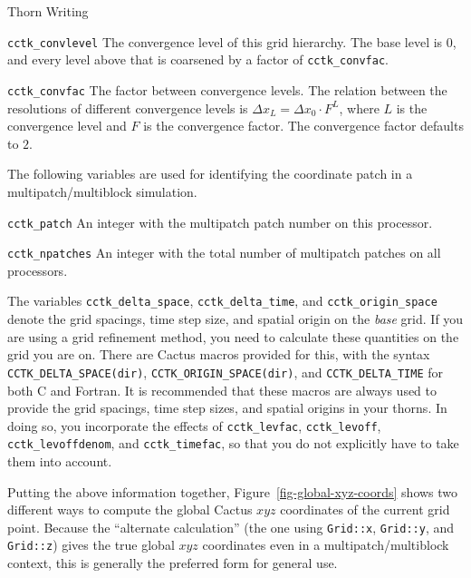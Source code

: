 \begin{cactuspart}{Thorn Writing}
\begin{Lentry}
\item [\texttt{cctk\_convlevel}] The convergence level of this grid hierarchy.
        The base level is $0$, and every level above that is
        coarsened by a factor of \texttt{cctk\_convfac}.
\item [\texttt{cctk\_convfac}] The factor between convergence levels.
        The relation between the resolutions of different convergence
        levels is $\Delta x_L = \Delta x_0 \cdot F^L$, where $L$ is the
        convergence level and $F$ is the convergence factor.
        The convergence factor defaults to $2$.
\end{Lentry}

The following variables are used for identifying the coordinate patch in a
multipatch/multiblock simulation.

\begin{Lentry}
\item [\texttt{cctk\_patch}] An integer with the multipatch patch
      number on this processor.
\item [\texttt{cctk\_npatches}] An integer with the total number of
      multipatch patches on all processors.
\end{Lentry}

The variables \texttt{cctk\_delta\_space}, \texttt{cctk\_delta\_time}, and
\texttt{cctk\_origin\_space} denote the grid spacings, time step size,
and spatial origin on the \textit{base} grid.  If you are using a grid
refinement method, you need to calculate these quantities on the grid
you are on.  There are Cactus macros provided for this, with the
syntax \texttt{CCTK\_DELTA\_SPACE(dir)}, \texttt{CCTK\_ORIGIN\_SPACE(dir)},
and \texttt{CCTK\_DELTA\_TIME} for both C and Fortran.  It is recommended
that these macros are always used to provide the grid spacings, time
step sizes, and spatial origins in your thorns.  In doing so, you
incorporate the effects of \texttt{cctk\_levfac}, \texttt{cctk\_levoff},
\texttt{cctk\_levoffdenom}, and \texttt{cctk\_timefac}, so that you do not
explicitly have to take them into account.

Putting the above information together, Figure~\ref{fig-global-xyz-coords}
shows two different ways to compute the global Cactus $xyz$ coordinates
of the current grid point.  Because the ``alternate calculation'' (the
one using \verb|Grid::x|, \verb|Grid::y|, and \verb|Grid::z|) gives the
true global $xyz$ coordinates even in a multipatch/multiblock context,
this is generally the preferred form for general use.


\end{cactuspart}
